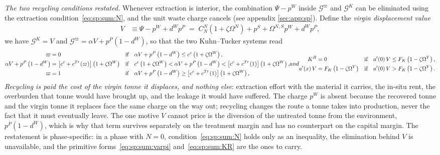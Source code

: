 \emph{The two recycling conditions restated.} Whenever extraction is interior, the combination
$\Psi-p^W$ inside $\mathcal G^\varpi$ and $\mathcal G^K$ can be eliminated using the extraction
condition~\eqref{eq:sp:sum:N}, and the unit waste charge cancels (see appendix \ref{sec:app:sp}). Define the \emph{virgin displacement value}
\begin{align}
V &\equiv \Psi-p^W+d^Wp^P \;=\; C^N_N\left(1+\zeta\Omega^N\right)+p^S+\Omega^{N,S}p^W+d^Wp^P,
\label{eq:sp:sum:V}
\end{align}
we have $\mathcal G^K=V$ and $\mathcal G^\varpi=\alpha V+p^P\left(1-d^W\right)$, so that the two
Kuhn--Tucker systems read
\begin{subequations}
\label{eq:sp:sum:recycling-virgin}
\begin{align}
\varpi &= 0
&&\text{if}\quad \alpha V+p^P\left(1-d^W\right)\le c^c\left(1+\zeta\Omega^W\right),
\notag
\\
\alpha V+p^P\left(1-d^W\right) &= \left[c^c+c^{T\prime}\left(\varpi\right)\right]\left(1+\zeta\Omega^W\right)
&&\text{if}\quad c^c\left(1+\zeta\Omega^W\right)<\alpha V+p^P\left(1-d^W\right)<\left[c^c+c^{T\prime}\left(1\right)\right]\left(1+\zeta\Omega^W\right),
\notag
\\
\varpi &= 1
&&\text{if}\quad \alpha V+p^P\left(1-d^W\right)\ge \left[c^c+c^{T\prime}\left(1\right)\right]\left(1+\zeta\Omega^W\right),
\label{eq:sp:sum:recycling-virgin-varpi}
\end{align}
and
\begin{align}
K^R &= 0
&&\text{if}\quad a'\!\left(0\right)V\le F_K\left(1-\zeta\Omega^Y\right),
\notag
\\
a'\!\left(x\right)V &= F_K\left(1-\zeta\Omega^Y\right)
&&\text{if}\quad a'\!\left(0\right)V> F_K\left(1-\zeta\Omega^Y\right).
\label{eq:sp:sum:recycling-virgin-KR}
\end{align}
\end{subequations}
\emph{Recycling is paid the cost of the virgin tonne it displaces, and nothing else}: extraction
effort with the material it carries, the in-situ rent, the overburden that tonne would have brought
up, and the leakage it would have suffered. The charge $p^W$ is absent because the recovered tonne and
the virgin tonne it replaces face the same charge on the way out; recycling changes the route a
tonne takes into production, never the fact that it must eventually leave. The one motive $V$ cannot
price is the diversion of the untreated tonne from the environment, $p^P\left(1-d^W\right)$, which is
why that term survives separately on the treatment margin and has no counterpart on the capital
margin. The restatement is phase-specific: in a phase with $N=0$, condition~\eqref{eq:sp:sum:N}
holds only as an inequality, the elimination behind $V$ is unavailable, and the primitive
forms~\eqref{eq:sp:sum:varpi} and~\eqref{eq:sp:sum:KR} are the ones to carry.

